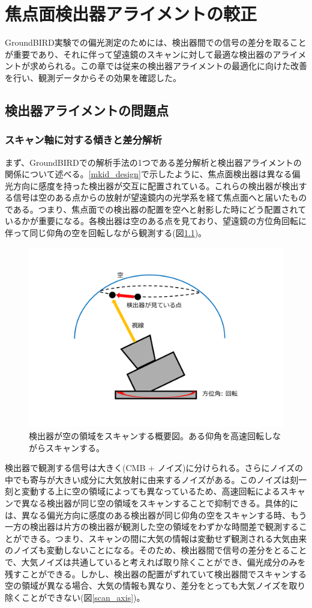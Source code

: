 \chapter{焦点面検出器アライメントの較正}
\label{chapter4}

GroundBIRD実験での偏光測定のためには、検出器間での信号の差分を取ることが重要であり、それに伴って望遠鏡のスキャンに対して最適な検出器のアライメントが求められる。この章では従来の検出器アライメントの最適化に向けた改善を行い、観測データからその効果を確認した。

\section{検出器アライメントの問題点}

\subsection{スキャン軸に対する傾きと差分解析}
まず、GroundBIRDでの解析手法の1つである差分解析と検出器アライメントの関係について述べる。\ref{mkid_design}で示したように、焦点面検出器は異なる偏光方向に感度を持った検出器が交互に配置されている。これらの検出器が検出する信号は空のある点からの放射が望遠鏡内の光学系を経て焦点面へと届いたものである。つまり、焦点面での検出器の配置を空へと射影した時にどう配置されているかが重要になる。各検出器は空のある点を見ており、望遠鏡の方位角回転に伴って同じ仰角の空を回転しながら観測する(図\ref{scan_image})。
\begin{figure}[htbp]
  \centering
  \includegraphics[width=0.6\columnwidth]{5_alignment/figs/scan_image.pdf}
  \caption{検出器が空の領域をスキャンする概要図。ある仰角を高速回転しながらスキャンする。}
  \label{scan_image}
\end{figure}
検出器で観測する信号は大きく(CMB + ノイズ)に分けられる。さらにノイズの中でも寄与が大きい成分に大気放射に由来するノイズがある。このノイズは刻一刻と変動する上に空の領域によっても異なっているため、高速回転によるスキャンで異なる検出器が同じ空の領域をスキャンすることで抑制できる。具体的には、異なる偏光方向に感度のある検出器が同じ仰角の空をスキャンする時、もう一方の検出器は片方の検出器が観測した空の領域をわずかな時間差で観測することができる。つまり、スキャンの間に大気の情報は変動せず観測される大気由来のノイズも変動しないことになる。そのため、検出器間で信号の差分をとることで、大気ノイズは共通していると考えれば取り除くことができ、偏光成分のみを残すことができる。しかし、検出器の配置がずれていて検出器間でスキャンする空の領域が異なる場合、大気の情報も異なり、差分をとっても大気ノイズを取り除くことができない(図\ref{scan_axis})。
